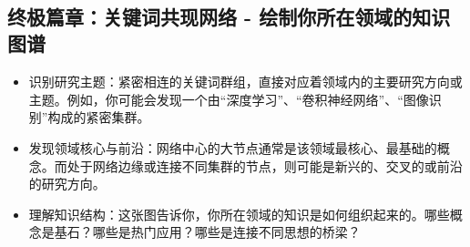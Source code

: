 \documentclass[11pt]{article}
\providecommand{\tightlist}{%
      \setlength{\itemsep}{0pt}\setlength{\parskip}{0pt}}
\begin{document}
    \begin{center}
    \end{center}
    { \hspace*{\fill} \\}
    
    \subsection{终极篇章：关键词共现网络 -
绘制你所在领域的知识图谱}\label{ux7ec8ux6781ux7bc7ux7ae0ux5173ux952eux8bcdux5171ux73b0ux7f51ux7edc---ux7ed8ux5236ux4f60ux6240ux5728ux9886ux57dfux7684ux77e5ux8bc6ux56feux8c31}

    \begin{itemize}
\tightlist
\item
  识别研究主题：紧密相连的关键词群组，直接对应着领域内的主要研究方向或主题。例如，你可能会发现一个由``深度学习''、``卷积神经网络''、``图像识别''构成的紧密集群。
\item
  发现领域核心与前沿：网络中心的大节点通常是该领域最核心、最基础的概念。而处于网络边缘或连接不同集群的节点，则可能是新兴的、交叉的或前沿的研究方向。
\item
  理解知识结构：这张图告诉你，你所在领域的知识是如何组织起来的。哪些概念是基石？哪些是热门应用？哪些是连接不同思想的桥梁？
\end{itemize}
\end{document}
